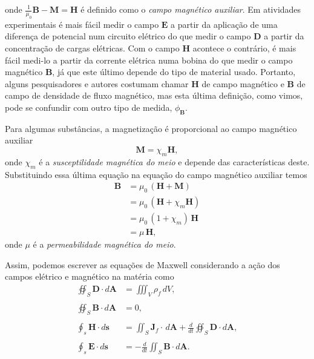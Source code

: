 onde $\frac{1}{\mu_0}\mathbf{B}-\mathbf{M}=\mathbf{H}$ \'e definido como o \textit{campo magn\'etico auxiliar}. Em atividades experimentais \'e mais f\'acil medir o campo 
$\mathbf{E}$ a partir da aplica\c{c}\~ao de uma diferen\c{c}a de potencial num circuito el\'etrico do que medir o campo $\mathbf{D}$ a partir da concentra\c{c}\~ao de cargas el\'etricas. Com o campo $\mathbf{H}$ acontece o contr\'ario, \'e mais f\'acil medi-lo a partir da corrente el\'etrica numa bobina do que medir o campo magn\'etico $\mathbf{B}$, j\'a que este \'ultimo depende do tipo de material usado. Portanto, alguns pesquisadores e autores costumam chamar $\mathbf{H}$ de campo magn\'etico e $\mathbf{B}$ de campo de densidade de fluxo magn\'etico, mas esta \'ultima defini\c{c}\~ao, como vimos, pode se confundir com outro tipo de medida, $\phi_\mathbf{B}$.

Para algumas subst\^ancias, a magnetiza\c{c}\~ao \'e proporcional ao campo magn\'etico auxiliar
\begin{equation*}
\mathbf{M}=\chi_m\mathbf{H},
\end{equation*}
onde $\chi_m$ \'e a \textit{susceptilidade magn\'etica do meio} e depende das caracter\'isticas deste. Substituindo essa \'ultima equa\c{c}\~ao na equa\c{c}\~ao do campo magn\'etico auxiliar temos
\begin{align*}
\mathbf{B}&=\mu_0\,(\mathbf{H}+\mathbf{M})\\
&=\mu_0\,(\mathbf{H}+\chi_m\mathbf{H})\\
&=\mu_0\,(1+\chi_m)\,\mathbf{H}\\
&=\mu\,\mathbf{H},
\end{align*}
onde $\mu$ \'e a \textit{permeabilidade magn\'etica do meio}.

Assim, podemos escrever as equa\c{c}\~oes de Maxwell considerando a a\c{c}\~ao dos campos el\'etrico e magn\'etico na mat\'eria como
\begin{align}\label{eq.max_meio_1}
\oiint_S\mathbf{D}\cdot d\mathbf{A}&=\iiint_{V}\rho_f\,dV,\\\nonumber\\\label{eq.max_meio_2}
\oiint_S\textbf{B}\cdot\textit{d}\textbf{A}&=0,\\\nonumber\\\label{eq.max_meio_3}
\oint_s\mathbf{H}\cdot d\mathbf{s}&=\iint_S\mathbf{J}_f\cdot\,d\mathbf{A}+\frac{d}{dt}\oiint_S\mathbf{D}\cdot\textit{d}\textbf{A},\\\nonumber\\\label{eq.max_meio_4}
\oint_s\mathbf{E}\cdot d\mathbf{s}&=-\frac{d}{dt}\iint_S\mathbf{B}\cdot d\mathbf{A}.
\end{align}

